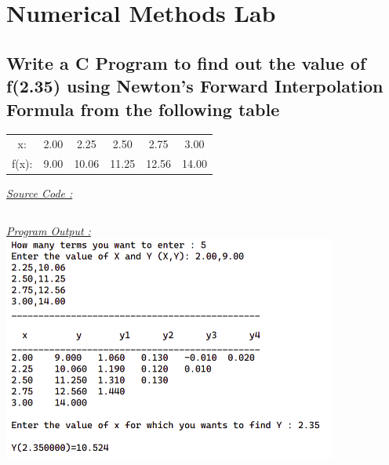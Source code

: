 \documentclass{article}
\begin{document}

\newpage
{}
\tableofcontents
\newpage
{}
\setcounter{page}{1}
\section{Numerical Methods Lab}

\subsection{Write a C Program to find out the value of f(2.35) using Newton's Forward Interpolation Formula from the following table}
\begin{center}
\begin{tabular}{c|c|c|c|c|c}
  x: & 2.00 & 2.25 & 2.50 & 2.75 & 3.00 \\
  f(x): & 9.00 & 10.06 & 11.25 & 12.56 & 14.00
\end{tabular}
\end{center}
\bigbreak
\underline{\emph{\Large Source Code :}}
\inputminted[breaklines,tabsize=2]{c}{1.c}
\bigbreak
\noindent
\underline{\emph{\Large Program Output :}}
\bigbreak
\noindent
\includegraphics[width=110mm,scale=0.5]{outputs/1}
\end{document}
